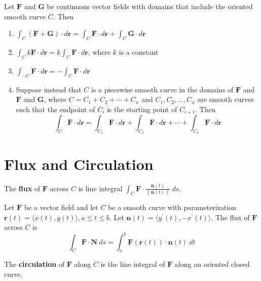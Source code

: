 \documentclass{article}
\begin{document}
Let $\mathbf{F}$ and $\mathbf{G}$ be continuous vector fields with domains that include the oriented smooth curve $C$. Then
\begin{enumerate}
    \item $\int_C(\mathbf{F}+\mathbf{G})\cdot d\mathbf{r}=\int_C\mathbf{F}\cdot d\mathbf{r}+\int_C\mathbf{G}\cdot d\mathbf{r}$
    \item $\int_C k\mathbf{F}\cdot d\mathbf{r}=k\int_C\mathbf{F}\cdot d\mathbf{r}$, where $k$ is a constant
    \item $\int_{-C}\mathbf{F}\cdot d\mathbf{r}=-\int_C\mathbf{F}\cdot d\mathbf{r}$
    \item Suppose instead that $C$ is a piecewise smooth curve in the domains of $\mathbf{F}$ and $\mathbf{F}$ and $\mathbf{G}$, where $C=C_1+C_2+\cdots+C_n$ and $C_1,C_2,\ldots,C_n$ are smooth curves such that the endpoint of $C_i$ is the starting point of $C_{i+1}$. Then
    \[\int_C\mathbf{F}\cdot d\mathbf{r}=\int_{C_1}\mathbf{F}\cdot d\mathbf{r}+\int_{C_2}\mathbf{F}\cdot d\mathbf{r}+\cdots+\int_{C_n}\mathbf{F}\cdot d\mathbf{r}\]
\end{enumerate}

\section*{Flux and Circulation}

The \textbf{flux} of $\mathbf{F}$ across $C$ is line integral $\int_C\mathbf{F}\cdot\frac{\mathbf{n}(t)}{\|\mathbf{n}(t)\|}\: ds$.
\vspace{1em}

Let $\mathbf{F}$ be a vector field and let $C$ be a smooth curve with parameterization $\mathbf{r}(t)=\langle x(t),y(t)\rangle,a\leq t\leq b$. Let $\mathbf{n}(t)=\langle y^\prime(t),-x^\prime(t)\rangle$. The flux of $\mathbf{F}$ across $C$ is
\[\int_C\mathbf{F}\cdot\mathbf{N}\: ds=\int_a^b\mathbf{F}(\mathbf{r}(t))\cdot\mathbf{n}(t)\: dt\]

The \textbf{circulation} of $\mathbf{F}$ along $C$ is the line integral of $\mathbf{F}$ along an oriented closed curve.
\end{document}
